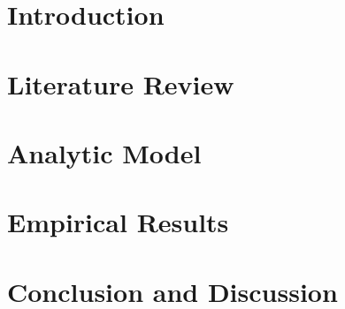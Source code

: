 \documentclass{ntuthesis}
\theoremstyle{definition}
\def\withwatermark{1}
\begin{document}
\frontmatter

\makecover

\ifdefined\excludefirstpage

  \def\withwatermark{1}
  \ifdefined\withwatermark
    \newsavebox\mybox
    \savebox{}
    \newwatermark*[allpages,xpos=6.1725cm,ypos=10.5225cm,scale=0.5]{\usebox\mybox}
  \fi

  \ifdefined\withdoi
    \insertdoi
  \fi
\fi


% 
% 


\mainmatter


\chapter{Introduction}
  \label{ch:intro}
\chapter{Literature Review} \label{ch:lit}

\chapter{Analytic Model} \label{ch:model}

\chapter{Empirical Results}  \label{ch:result}

\chapter{Conclusion and Discussion} \label{ch:conclusion}



\backmatter
{}
{}




%   
\end{document}
